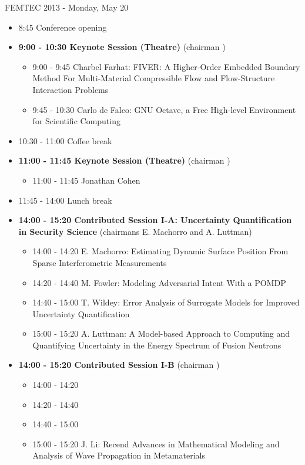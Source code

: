 \documentclass[10pt, A4]{article}%
\begin{document}
\centerline{\huge FEMTEC 2013 - Monday, May 20}
\vspace{4mm}

\begin{itemize}    
  \item 8:45 Conference opening
  \item {\bf 9:00 - 10:30 Keynote Session (Theatre)} (chairman ) 
  \begin{itemize}
    \item 9:00 - 9:45 {Charbel Farhat}: {FIVER: A Higher-Order Embedded Boundary Method For Multi-Material Compressible Flow and Flow-Structure Interaction Problems}
    \item 9:45 - 10:30 {Carlo de Falco}: {GNU Octave, a Free High-level Environment for Scientific Computing}
  \end{itemize}
  \item 10:30 - 11:00 Coffee break
  \item {\bf 11:00 - 11:45 Keynote Session (Theatre)} (chairman ) 
  \begin{itemize}
    \item 11:00 - 11:45 {Jonathan Cohen}
  \end{itemize}
  \item 11:45 - 14:00 Lunch break      
  \item {\bf 14:00 - 15:20 Contributed Session I-A: Uncertainty Quantification in Security Science} (chairmans E. Machorro and A. Luttman) 
  \begin{itemize}
    \item 14:00 - 14:20 {E. Machorro}: {Estimating Dynamic Surface Position From Sparse Interferometric Measurements}
    \item 14:20 - 14:40 {M. Fowler}: {Modeling Adversarial Intent With a POMDP}
    \item 14:40 - 15:00 {T. Wildey}: {Error Analysis of Surrogate Models for Improved Uncertainty Quantification}
    \item 15:00 - 15:20 {A. Luttman}: {A Model-based Approach to Computing and Quantifying Uncertainty in the Energy Spectrum of Fusion Neutrons}
  \end{itemize}
  \item {\bf 14:00 - 15:20 Contributed Session I-B} (chairman ) 
  \begin{itemize}
    \item 14:00 - 14:20 
    \item 14:20 - 14:40 
    \item 14:40 - 15:00 
    \item 15:00 - 15:20 {J. Li}: {Recend Advances in Mathematical Modeling and Analysis of Wave Propagation in Metamaterials}

\end{itemize}
\end{itemize}
\end{document}
